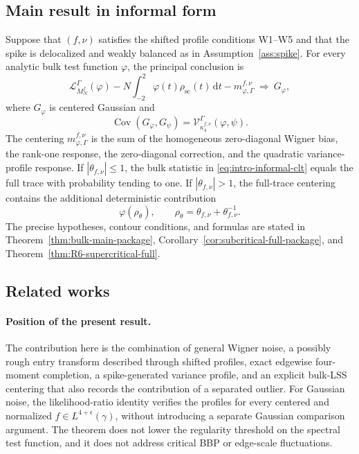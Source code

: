 \documentclass[11pt]{article}
\theoremstyle{definition}
\theoremstyle{remark}
\newcommand{\Cov}{\operatorname{Cov}}
\newcommand{\scal}{\mathrm{sc}}
\newcommand{\dd}{\mathrm d}
\begin{document}
\subsection{Main result in informal form}
\label{subsec:intro-main-result}

Suppose that $(f,\nu)$ satisfies the shifted profile conditions W1--W5 and
that the spike is delocalized and weakly balanced as in
Assumption~\ref{ass:spike}.  For every analytic bulk test function $\varphi$,
the principal conclusion is
\begin{equation}
 \mathcal L_{M_N^f}^{\Gamma}(\varphi)
 -N\int_{-2}^2\varphi(t)\rho_{\scal}(t)\,\dd t
 -m_{\varphi,\Gamma}^{f,\nu}
 \ \Longrightarrow\ G_\varphi,
 \label{eq:intro-informal-clt}
\end{equation}
where $G_\varphi$ is centered Gaussian and
\begin{equation}
 \Cov(G_\varphi,G_\psi)
 =\mathcal V_{\kappa_4^{f,\nu}}^\Gamma(\varphi,\psi).
 \label{eq:intro-informal-covariance}
\end{equation}
The centering $m_{\varphi,\Gamma}^{f,\nu}$ is the sum of the homogeneous
zero-diagonal Wigner bias, the rank-one response, the zero-diagonal
correction, and the quadratic variance-profile response.  If
$|\theta_{f,\nu}|\leq1$, the bulk statistic in
\eqref{eq:intro-informal-clt} equals the full trace with probability tending
to one.  If $|\theta_{f,\nu}|>1$, the full-trace centering contains the
additional deterministic contribution
\[
 \varphi(\rho_\theta),\qquad
 \rho_\theta=\theta_{f,\nu}+\theta_{f,\nu}^{-1}.
\]
The precise hypotheses, contour conditions, and formulas are stated in
Theorem~\ref{thm:bulk-main-package},
Corollary~\ref{cor:subcritical-full-package}, and
Theorem~\ref{thm:R6-supercritical-full}.

\subsection{Related works}

\paragraph*{Position of the present result.}
The contribution here is the combination of general Wigner noise, a
possibly rough entry transform described through shifted profiles, exact
edgewise four-moment completion, a spike-generated variance profile, and an
explicit bulk-LSS centering that also records the contribution of a separated
outlier.  For Gaussian noise, the likelihood-ratio identity verifies the
profiles for every centered and normalized
$f\in L^{4+\epsilon}(\gamma)$, without introducing a separate Gaussian
comparison argument.  The theorem does not lower the regularity threshold on
the spectral test function, and it does not address critical BBP or edge-scale
fluctuations.
\end{document}
